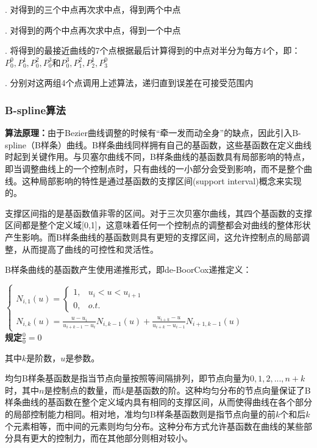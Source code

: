 \documentclass[a4paper,UTF8]{article}
\theoremstyle{definition}
\begin{document}
. 对得到的三个中点再次求中点，得到两个中点

. 对得到的两个中点再次求中点，得到一个中点

. 将得到的最接近曲线的7个点根据最后计算得到的中点对半分为每方4个，即：$P_0^0,P_0^1,P_0^2,P_0^3$和$P_0^3,P_1^2,P_2^1,P_3^0$ 

. 分别对这两组4个点调用上述算法，递归直到误差在可接受范围内

\subsubsection{B-spline算法}

\textbf{算法原理：}由于Bezier曲线调整的时候有“牵一发而动全身”的缺点，因此引入B-spline（B样条）曲线。B样条曲线同样拥有自己的基函数，这些基函数在定义曲线时起到关键作用。与贝塞尔曲线不同，B样条曲线的基函数具有局部影响的特点，即当调整曲线上的一个控制点时，只有曲线的一小部分会受到影响，而不是整个曲线。这种局部影响的特性是通过基函数的支撑区间(support interval)概念来实现的。

支撑区间指的是基函数值非零的区间。对于三次贝塞尔曲线，其四个基函数的支撑区间都是整个定义域[0,1]，这意味着任何一个控制点的调整都会对曲线的整体形状产生影响。而B样条曲线的基函数则具有更短的支撑区间，这允许控制点的局部调整，从而提高了曲线的可控性和灵活性。

B样条曲线的基函数产生使用递推形式，即de-BoorCox递推定义：

\begin{center}
	$
	\begin{cases}  
		N_{i,1}(u)=\begin{cases}
			1,	& u_i < u < u_{i+1}	\\
			0, 	& o.t.
		\end{cases} \\
		N_{i,k}(u)=\frac{u-u_i}{u_{i+k-1}-u_i}N_{i,k-1}(u)+\frac{u_{i+k}-u}{u_{i+k}-u_{i-1}}N_{i+1,k-1}(u)
	\end{cases} 
	$	\\
	\textbf{规定$\frac{0}{0}=0$}
\end{center}

其中$k$是阶数，$u$是参数。

均匀B样条基函数是指当节点向量按照等间隔排列，即节点向量为$0,1,2,...,n+k$时，其中$n$是控制点的数量，而$k$是基函数的阶。这种均匀分布的节点向量保证了B样条曲线的基函数在整个定义域内具有相同的支撑区间，从而使得曲线在各个部分的局部控制能力相同。相对地，准均匀B样条基函数则是指节点向量的前$k$个和后$k$个元素相等，而中间的元素则均匀分布。这种分布方式允许基函数在曲线的某些部分具有更大的控制力，而在其他部分则相对较小。
\end{document}
